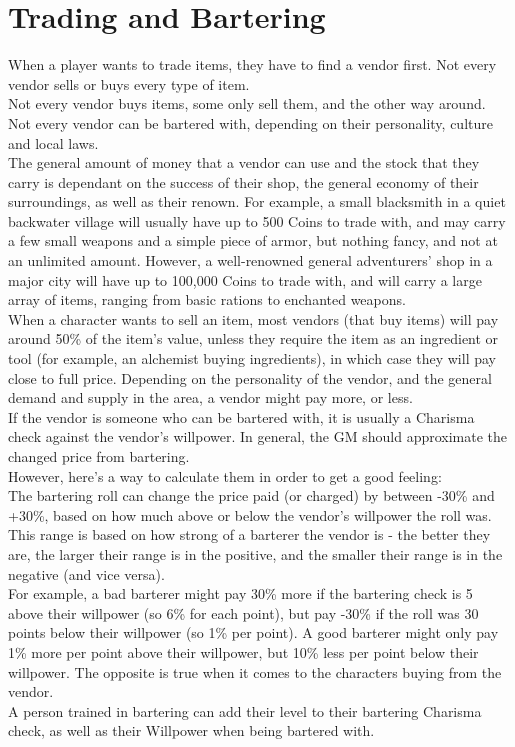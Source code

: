 \section{Trading and Bartering}\label{sec:trading}
When a player wants to trade items, they have to find a vendor first.
Not every vendor sells or buys every type of item.\\
Not every vendor buys items, some only sell them, and the other way around.
Not every vendor can be bartered with, depending on their personality, culture and local laws.\\
The general amount of money that a vendor can use and the stock that they carry is dependant on the success of their shop, the general economy of their surroundings, as well as their renown.
For example, a small blacksmith in a quiet backwater village will usually have up to 500 Coins to trade with, and may carry a few small weapons and a simple piece of armor, but nothing fancy, and not at an unlimited amount.
However, a well-renowned general adventurers' shop in a major city will have up to 100,000 Coins to trade with, and will carry a large array of items, ranging from basic rations to enchanted weapons.\\
When a character wants to sell an item, most vendors (that buy items) will pay around 50\% of the item's value, unless they require the item as an ingredient or tool (for example, an alchemist buying ingredients), in which case they will pay close to full price.
Depending on the personality of the vendor, and the general demand and supply in the area, a vendor might pay more, or less.\\
If the vendor is someone who can be bartered with, it is usually a Charisma check against the vendor's willpower.
In general, the GM should approximate the changed price from bartering.\\
However, here's a way to calculate them in order to get a good feeling:\\
The bartering roll can change the price paid (or charged) by between -30\% and +30\%, based on how much above or below the vendor's willpower the roll was.
This range is based on how strong of a barterer the vendor is - the better they are, the larger their range is in the positive, and the smaller their range is in the negative (and vice versa).\\
For example, a bad barterer might pay 30\% more if the bartering check is 5 above their willpower (so 6\% for each point), but pay -30\% if the roll was 30 points below their willpower (so 1\% per point).
A good barterer might only pay 1\% more per point above their willpower, but 10\% less per point below their willpower.
The opposite is true when it comes to the characters buying from the vendor.\\
A person trained in bartering can add their level to their bartering Charisma check, as well as their Willpower when being bartered with.